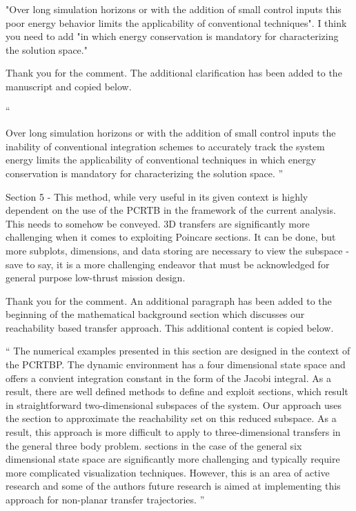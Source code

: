 \documentclass[11pt]{article}
\newenvironment{correction}{\begin{list}{}{\setlength{\leftmargin}{1cm}\setlength{\rightmargin}{1cm}}\vspace{\parsep}\item[]``}{''\end{list}}
\begin{document}
\begin{enumerate}
\item 
    \begin{itshape}
"Over long simulation horizons or with the addition of small control inputs this poor energy behavior limits the applicability of conventional techniques".  I think you need to add "in which energy conservation is mandatory for characterizing the solution space."
\end{itshape}

Thank you for the comment.
The additional clarification has been added to the manuscript and copied below.
\begin{correction}

Over long simulation horizons or with the addition of small control inputs the inability of conventional integration schemes to accurately track the system energy limits the applicability of conventional techniques in which energy conservation is mandatory for characterizing the solution space.
\end{correction}

\item 
    \begin{itshape}
Section 5 - This method, while very useful in its given context is highly dependent on the use of the PCRTB in the framework of the current analysis.  This needs to somehow be conveyed.  3D transfers are significantly more challenging when it comes to exploiting Poincare sections.  It can be done, but more subplots, dimensions, and data storing are necessary to view the subspace - save to say, it is a more challenging endeavor that must be acknowledged for general purpose low-thrust mission design.
\end{itshape}

Thank you for the comment.
An additional paragraph has been added to the beginning of the mathematical background section which discusses our reachability based transfer approach.
This additional content is copied below.

\begin{correction}
The numerical examples presented in this section are designed in the context of the PCRTBP.
The dynamic environment has a four dimensional state space and offers a convient integration constant in the form of the Jacobi integral.
As a result, there are well defined methods to define and exploit \Poincare sections, which result in straightforward two-dimensional subspaces of the system.
Our approach uses the \Poincare section to approximate the reachability set on this reduced subspace.
As a result, this approach is more difficult to apply to three-dimensional transfers in the general three body problem.
\Poincare sections in the case of the general six dimensional state space are significantly more challenging and typically require more complicated visualization techniques. 
However, this is an area of active research and some of the authors future research is aimed at implementing this approach for non-planar transfer trajectories.
\end{correction}


\end{enumerate}
\end{document}
